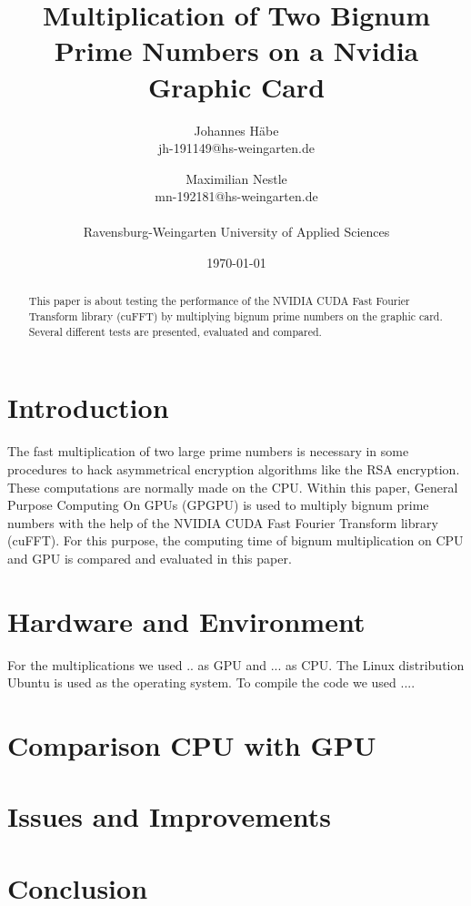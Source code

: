 \documentclass[12pt,a4paper]{article}
\title{Multiplication of Two Bignum Prime Numbers on a Nvidia Graphic Card}
\author{Johannes H\"abe  \\
	jh-191149@hs-weingarten.de
	\and 
	Maximilian Nestle \\
	mn-192181@hs-weingarten.de \\\\
	Ravensburg-Weingarten University of Applied Sciences
	}
\date{\today}
\begin{document}
\maketitle
%
\begin{abstract}
This paper is about testing the performance of the NVIDIA CUDA Fast Fourier Transform library (cuFFT) by multiplying bignum prime numbers on the graphic card. Several different tests are presented, evaluated and compared.
\end{abstract}

\section{Introduction}
The fast multiplication of two large prime numbers is necessary in some procedures to hack asymmetrical encryption algorithms like the RSA encryption. These computations are normally made on the CPU. Within this paper, General Purpose Computing On GPUs (GPGPU) is used to multiply bignum prime numbers with the help of the NVIDIA CUDA Fast Fourier Transform library (cuFFT). For this purpose, the computing time of bignum multiplication on CPU and GPU is compared and evaluated in this paper.

\section{Hardware and Environment}
For the multiplications we used .. as GPU and ... as CPU. The Linux distribution Ubuntu is used as the operating system. To compile the code we used ....

\section{Comparison CPU with GPU}

\section{Issues and Improvements}

\section{Conclusion}


\end{document}
